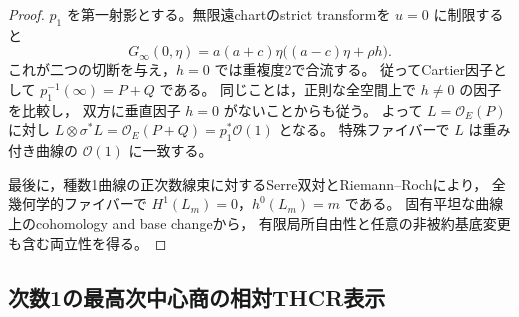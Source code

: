 \begin{proof}
$p_1$ を第一射影とする。無限遠chartのstrict transformを $u=0$ に制限すると
\begin{equation}\label{eq:degree-one-infinity-divisor}
 G_\infty(0,\eta)
   =a(a+c)\eta\bigl((a-c)\eta+\rho h\bigr).
\end{equation}
これが二つの切断を与え，$h=0$ では重複度2で合流する。
従ってCartier因子として $p_1^{-1}(\infty)=P+Q$ である。
同じことは，正則な全空間上で $h\ne0$ の因子を比較し，
双方に垂直因子 $h=0$ がないことからも従う。
よって $L=\mathcal O_E(P)$ に対し
$L\otimes\sigma^*L=\mathcal O_E(P+Q)=p_1^*\mathcal O(1)$ となる。
特殊ファイバーで $L$ は重み付き曲線の $\mathcal O(1)$ に一致する。

最後に，種数1曲線の正次数線束に対するSerre双対とRiemann--Rochにより，
全幾何学的ファイバーで $H^1(L_m)=0$，$h^0(L_m)=m$ である。
固有平坦な曲線上のcohomology and base changeから，
有限局所自由性と任意の非被約基底変更も含む両立性を得る。
\end{proof}

\subsection{次数1の最高次中心商の相対THCR表示}

